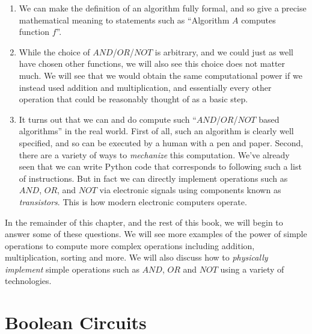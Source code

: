 \begin{enumerate}
\def\labelenumi{\arabic{enumi}.}
\item
  We can make the definition of an algorithm fully formal, and so give a
  precise mathematical meaning to statements such as ``Algorithm \(A\)
  computes function \(f\)''.
\item
  While the choice of
  \(\ensuremath{\mathit{AND}}\)/\(\ensuremath{\mathit{OR}}\)/\(\ensuremath{\mathit{NOT}}\)
  is arbitrary, and we could just as well have chosen other functions,
  we will also see this choice does not matter much. We will see that we
  would obtain the same computational power if we instead used addition
  and multiplication, and essentially every other operation that could
  be reasonably thought of as a basic step.
\item
  It turns out that we can and do compute such
  ``\(\ensuremath{\mathit{AND}}\)/\(\ensuremath{\mathit{OR}}\)/\(\ensuremath{\mathit{NOT}}\)
  based algorithms'' in the real world. First of all, such an algorithm
  is clearly well specified, and so can be executed by a human with a
  pen and paper. Second, there are a variety of ways to \emph{mechanize}
  this computation. We've already seen that we can write Python code
  that corresponds to following such a list of instructions. But in fact
  we can directly implement operations such as
  \(\ensuremath{\mathit{AND}}\), \(\ensuremath{\mathit{OR}}\), and
  \(\ensuremath{\mathit{NOT}}\) via electronic signals using components
  known as \emph{transistors}. This is how modern electronic computers
  operate.
\end{enumerate}

In the remainder of this chapter, and the rest of this book, we will
begin to answer some of these questions. We will see more examples of
the power of simple operations to compute more complex operations
including addition, multiplication, sorting and more. We will also
discuss how to \emph{physically implement} simple operations such as
\(\ensuremath{\mathit{AND}}\), \(\ensuremath{\mathit{OR}}\) and
\(\ensuremath{\mathit{NOT}}\) using a variety of technologies.

\section{Boolean Circuits}\label{booleancircuitfig}


